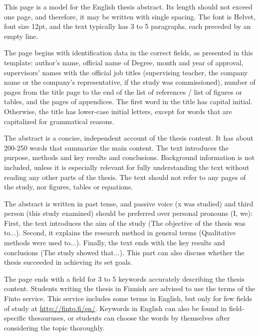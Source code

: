 This page is a model for the English thesis abstract.
Its length should not exceed one page, and therefore, it may be written with single spacing.
The font is Helvet, font size 12pt, and the text typically has 3 to 5 paragraphs, each preceded by an empty line.

The page begins with identification data in the correct fields, as presented in this template: author’s name, official name of Degree, month and year of approval, supervisors’ names with the official job titles (supervising teacher, the company name or the company’s representative, if the study was commissioned), number of pages from the title page to the end of the list of references / list of figures or tables, and the pages of appendices.
The first word in the title has capital initial.
Otherwise, the title has lower-case initial letters, except for words that are capitalized for grammatical reasons.

The abstract is a concise, independent account of the thesis content.
It has about 200-250 words that summarize the main content.
The text introduces the purpose, methods and key results and conclusions.
Background information is not included, unless it is especially relevant for fully understanding the text without reading any other parts of the thesis.
The text should not refer to any pages of the study, nor figures, tables or equations.

The abstract is written in past tense, and passive voice (x was studied) and third person (this study examined) should be preferred over personal pronouns (I, we): First, the text introduces the aim of the study (The objective of the thesis was to...).
Second, it explains the research method in general terms (Qualitative methods were used to...).
Finally, the text ends with the key results and conclusions (The study showed that...).
This part can also discuss whether the thesis succeeded in achieving its set goals. 

The page ends with a field for 3 to 5 keywords accurately describing the thesis content.
Students writing the thesis in Finnish are advised to use the terms of the Finto service.
This service includes some terms in English, but only for few fields of study at \url{http://finto.fi/en/}.
Keywords in English can also be found in field-specific thesauruses, or students can choose the words by themselves after considering the topic thoroughly.
